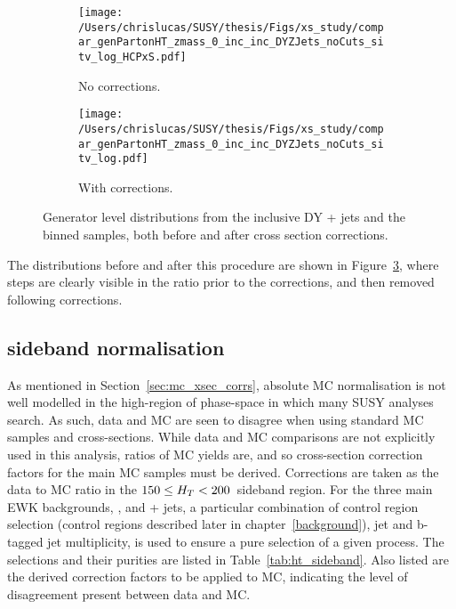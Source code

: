 \begin{figure}[b!]
  \centering
  \begin{subfigure}[b]{0.48\textwidth}
    \texttt{[image: /Users/chrislucas/SUSY/thesis/Figs/xs\_study/compar\_genPartonHT\_zmass\_0\_inc\_inc\_DYZJets\_noCuts\_sitv\_log\_HCPxS.pdf]}
    \caption{No corrections.}
    \label{fig:xsec_study_before}
  \end{subfigure}             
  \begin{subfigure}[b]{0.48\textwidth}
    \texttt{[image: /Users/chrislucas/SUSY/thesis/Figs/xs\_study/compar\_genPartonHT\_zmass\_0\_inc\_inc\_DYZJets\_noCuts\_sitv\_log.pdf]}
    \caption{With corrections.}
    \label{fig:xsec_study_after}
  \end{subfigure}             
  \caption{Generator level \HTpart distributions from the
    inclusive DY + jets and the \HTpart binned \zj
    samples, both before and after cross section corrections.}
  \label{fig:xsec_study}
\end{figure}

The \HTpart distributions before and after this procedure are shown in
Figure~\ref{fig:xsec_study}, where steps are clearly visible in the
ratio prior to the corrections, and then removed following corrections.


\subsection{\HT sideband normalisation}

As mentioned in Section~\ref{sec:mc_xsec_corrs}, absolute MC 
normalisation is not well modelled in the high-\met region of 
phase-space in which many SUSY analyses search. As such, data and MC are seen to
disagree when using standard MC samples and cross-sections. While data and MC
comparisons are not explicitly used in this analysis, ratios of MC yields are, 
and so cross-section correction factors for the main 
MC samples must be derived. Corrections are taken as the data to MC ratio
in the $150 \leq H_T < 200$~\gev sideband region. For the three main EWK backgrounds,
\wj, \zj and \ttbar + jets, a particular combination of control region selection (control regions described
later in chapter~\ref{background}), jet and b-tagged jet multiplicity, is used to ensure
a pure selection of a given process. The selections and their purities are listed in 
Table~\ref{tab:ht_sideband}. Also listed are the derived correction factors to
be applied to MC, indicating the level of disagreement present between data and MC.

